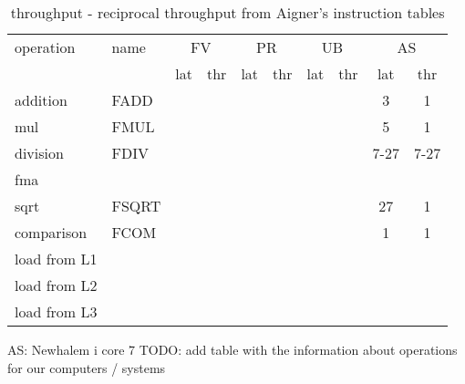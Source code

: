 \documentclass[12pt,a4paper,oneside]{article}
\begin{document}
		\begin{table}[h!]
			\centering
			\begin{tabular}{ll|cccccccc}
				\toprule
				operation& name & \multicolumn{2}{c}{FV} & \multicolumn{2}{c}{PR}  & \multicolumn{2}{c}{UB}  & \multicolumn{2}{c}{AS} \\
				&& lat & thr& lat & thr& lat & thr & lat & thr \\
				\midrule
				addition & FADD& & & && && 3 & 1 \\
				mul  & FMUL &&&&&&&5&1\\
				division & FDIV& & & && && 7-27 &  7-27\\
				fma & & & & && &&& \\
				sqrt &FSQRT& & & && &&27& 1\\
				comparison & FCOM  & & & && &&1 & 1\\
				load from L1 & & & & && &&& \\
				load from L2 && & & && &&& \\
				load from L3 && & & && &&& \\
				\bottomrule 
			\end{tabular}
			\caption{ throughput - reciprocal throughput from Aigner's instruction tables}
		\end{table}
	
	AS: Newhalem i core 7
	TODO: add table with the information about operations for our computers / systems
	
\end{document}
